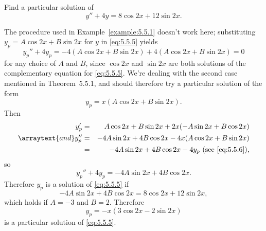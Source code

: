 \setcounter{example}{1}
\setcounter{equation}{4}
\begin{example}
  \label{example:5.5.2} \rm Find a particular solution of
  \begin{equation}
    \label{eq:5.5.5}y''+4y=8\cos2x+12\sin2x.
  \end{equation}
\end{example}
\setcounter{equation}{5}
\begin{examplesolution}
\solution The procedure used in Example~\ref{example:5.5.1} doesn't work here; substituting
$y_{p}=A\cos2x+B\sin2x$ for $y$ in \eqref{eq:5.5.5} yields
\[
  y_{p}''+4y_{p}=-4(A\cos2x+B\sin2x)+4(A\cos2x+B\sin2x)=0
\]
for any choice of $A$ and $B$, since $\cos2x$ and $\sin2x$ are both solutions of the complementary
equation for \eqref{eq:5.5.5}. We're dealing with the second case mentioned in
Theorem~5.5.1, and should therefore try a particular solution of the form
\begin{equation}
  \label{eq:5.5.6}y_{p}=x(A\cos2x+B\sin2x).
\end{equation}
Then
\begin{eqnarray*}
  y_{p}'                 & = & A\cos2x+B\sin2x+2x(-A\sin2x+B\cos2x)   \\
  \arraytext{and}y_{p}'' & = & -4A\sin2x+4B\cos2x-4x(A\cos2x+B\sin2x) \\
                         & = & -4A\sin2x+4B\cos2x-4y_{p}\mbox{ (see \eqref{eq:5.5.6})},
\end{eqnarray*}
so
\[
  y_{p}''+4y_{p}=-4A\sin2x+4B\cos2x.
\]
Therefore $y_{p}$ is a solution of \eqref{eq:5.5.5} if
\[
  -4A\sin2x+4B\cos2x=8\cos2x+12\sin2x,
\]
which holds if $A=-3$ and $B=2$. Therefore
\[
  y_{p}=-x(3\cos2x-2\sin2x)
\]
is a particular solution of \eqref{eq:5.5.5}.
\end{examplesolution}

